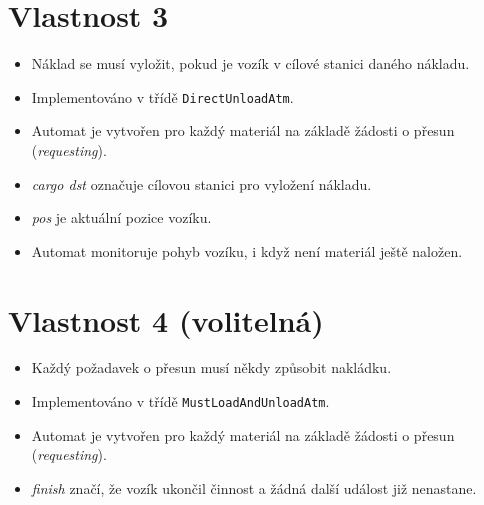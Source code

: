 \documentclass[a4paper, 11pt, fleqn]{scrartcl}
\begin{document}
  \section*{Vlastnost 3}
    \begin{itemize}[noitemsep]
      \item Náklad se musí vyložit, pokud je vozík v cílové stanici daného nákladu.
      \item Implementováno v třídě \texttt{DirectUnloadAtm}.
      \item Automat je vytvořen pro každý materiál na základě žádosti o přesun (\textit{requesting}).
      \item \textit{cargo dst} označuje cílovou stanici pro vyložení nákladu.
      \item \textit{pos} je aktuální pozice vozíku.
      \item Automat monitoruje pohyb vozíku, i když není materiál ještě naložen.
    \end{itemize}

    \begin{figure}[!h]
      \centering
    \end{figure}

  \newpage

  \section*{Vlastnost 4 (volitelná)}
    \begin{itemize}[noitemsep]
      \item Každý požadavek o přesun musí někdy způsobit nakládku.
      \item Implementováno v třídě \texttt{MustLoadAndUnloadAtm}.
      \item Automat je vytvořen pro každý materiál na základě žádosti o přesun (\textit{requesting}).
      \item \textit{finish} značí, že vozík ukončil činnost a žádná další událost již nenastane.
    \end{itemize}
\end{document}

